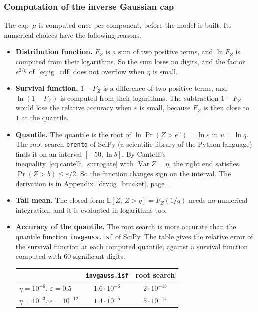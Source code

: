 \documentclass[11pt,a4paper]{article}
\theoremstyle{plain}
\theoremstyle{definition}
\theoremstyle{remark}
\begin{document}
\subsubsection{Computation of the inverse Gaussian cap}
The cap~$\bar\mu$ is computed once per component, before the model is built.
Its numerical choices have the following reasons.
\begin{itemize}
  \item \textbf{Distribution function.} $F_Z$ is a sum of two positive terms, and $\ln F_Z$ is computed from their logarithms.
    So the sum loses no digits, and the factor $e^{2/\eta}$ of~\eqref{eq:ig_cdf} does not overflow when $\eta$ is small.
  \item \textbf{Survival function.} $1 - F_Z$ is a difference of two positive terms, and $\ln(1 - F_Z)$ is computed from their logarithms.
    The subtraction $1 - F_Z$ would lose the relative accuracy when $\varepsilon$ is small, because $F_Z$ is then close to~$1$ at the quantile.
  \item \textbf{Quantile.} The quantile is the root of $\ln\Pr(Z > e^u) = \ln\varepsilon$ in $u = \ln q$.
    The root search \texttt{brentq} of SciPy (a scientific library of the Python language) finds it on an interval $[-50, \ln b]$.
    By Cantelli's inequality~\eqref{eq:cantelli_surrogate} with $\operatorname{Var} Z = \eta$, the right end satisfies $\Pr(Z > b) \le \varepsilon/2$.
    So the function changes sign on the interval.
    The derivation is in Appendix~\ref{drv:ig_bracket}, page~\pageref{drv:ig_bracket}.
  \item \textbf{Tail mean.} The closed form $\mathbb{E}[Z;\, Z > q] = F_Z(1/q)$ needs no numerical integration, and it is evaluated in logarithms too.
  \item \textbf{Accuracy of the quantile.} The root search is more accurate than the quantile function \texttt{invgauss.isf} of SciPy.
    The table gives the relative error of the survival function at each computed quantile, against a survival function computed with $60$ significant digits.
    \begin{center}
    \small
    \begin{tabular}{@{}lcc@{}}
    \toprule
\rowcolor{headgrey}
     & \texttt{invgauss.isf} & root search \\
    \midrule
    $\eta = 10^{-6}$, $\varepsilon = 0.5$ & $1.6 \cdot 10^{-6}$ & $2 \cdot 10^{-13}$ \\
    $\eta = 10^{-3}$, $\varepsilon = 10^{-12}$ & $1.4 \cdot 10^{-5}$ & $5 \cdot 10^{-14}$ \\

\end{tabular}
\end{center}
\end{itemize}
\end{document}
